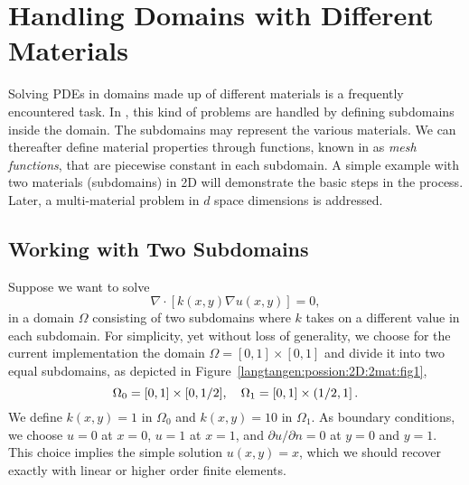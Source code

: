 \section{Handling Domains with Different Materials}

Solving PDEs in domains made up of different materials is a frequently
encountered task. In \fenics, this kind of problems are handled by 
defining subdomains inside the domain. The subdomains may represent the
various materials. We can thereafter define material properties through
functions, known in \fenics{} as \emph{mesh functions}, 
that are piecewise constant in each subdomain.
A simple example with
two materials (subdomains) in 2D will
demonstrate the basic steps in the process. Later, a multi-material
problem in $d$ space dimensions is addressed.

\subsection{Working with Two Subdomains}
\label{langtangen:possion:2D:2mat:problem}


Suppose we want to solve
\begin{equation} \label{langtangen:poisson:2D:2mat:varcoeff2}
    \nabla\cdot \left\lbrack k(x,y)\nabla u(x,y)\right\rbrack = 0,
\end{equation}
in a domain $\Omega$ consisting of two subdomains where $k$ takes on
a different value in each subdomain.
For simplicity, yet without loss of generality, we choose for the current
implementation
the domain $\Omega = [0,1]\times [0,1]$ and divide it into two equal
subdomains, as depicted in Figure~\ref{langtangen:possion:2D:2mat:fig1},
\[ \Omega_0 = [0, 1]\times [0,1/2],\quad
\Omega_1 = [0, 1]\times (1/2,1]\thinspace .\]
We define $k(x,y)=1$ in $\Omega_0$ and $k(x,y)=10$ in $\Omega_1$.
As boundary conditions, we choose $u=0$ at $x=0$, $u=1$ at $x=1$,
and $\partial u/\partial n=0$ at $y=0$ and $y=1$.
This choice implies the simple solution $u(x,y)=x$, which we should
recover exactly with linear or higher order finite elements.

